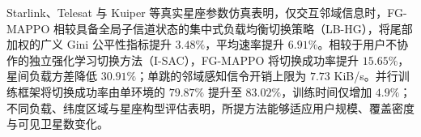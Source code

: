 Starlink、Telesat 与 Kuiper 等真实星座参数仿真表明，仅交互邻域信息时，FG-MAPPO 相较具备全局子信道状态的集中式负载均衡切换策略（LB-HG），将尾部加权的广义 Gini 公平性指标提升 $3.48\%$，平均速率提升 $6.91\%$。相较于用户不协作的独立强化学习切换方法（I-SAC），FG-MAPPO 将切换成功率提升 $15.65\%$，星间负载方差降低 $30.91\%$；单跳的邻域感知信令开销上限为 $7.73$ KiB/s。并行训练框架将切换成功率由单环境的 $79.87\%$ 提升至 $83.02\%$，训练时间仅增加 $4.9\%$；不同负载、纬度区域与星座构型评估表明，所提方法能够适应用户规模、覆盖密度与可见卫星数变化。
